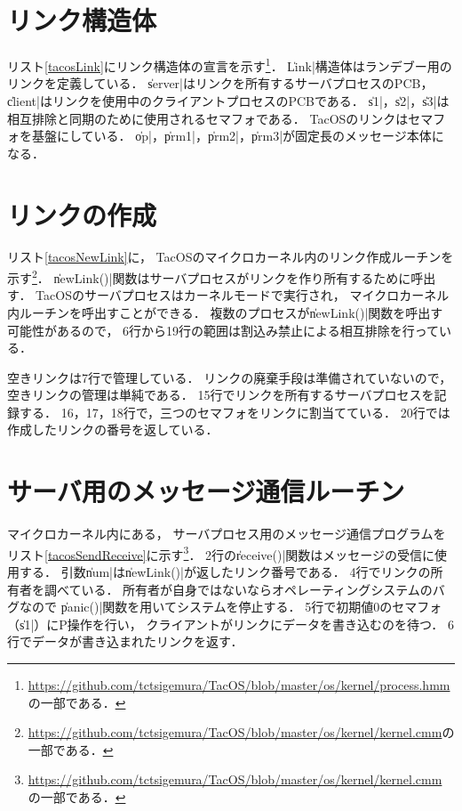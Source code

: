 \section{リンク構造体}
リスト\ref{tacosLink}にリンク構造体の宣言を示す\footnote{
  \url{https://github.com/tctsigemura/TacOS/blob/master/os/kernel/process.hmm}
  の一部である．}．
\|Link|構造体はランデブー用のリンクを定義している．
\|server|はリンクを所有するサーバプロセスのPCB，
\|client|はリンクを使用中のクライアントプロセスのPCBである．
\|s1|，\|s2|，\|s3|は
相互排除と同期のために使用されるセマフォである．
TacOSのリンクはセマフォを基盤にしている．
\|op|，\|prm1|，\|prm2|，\|prm3|が固定長のメッセージ本体になる．



\section{リンクの作成}
リスト\ref{tacosNewLink}に，
TacOSのマイクロカーネル内のリンク作成ルーチンを示す\footnote{
  \url{https://github.com/tctsigemura/TacOS/blob/master/os/kernel/kernel.cmm}の
  一部である．}．
\|newLink()|関数はサーバプロセスがリンクを作り所有するために呼出す．
TacOSのサーバプロセスはカーネルモードで実行され，
マイクロカーネル内ルーチンを呼出すことができる．
複数のプロセスが\|newLink()|関数を呼出す可能性があるので，
6行から19行の範囲は割込み禁止による相互排除を行っている．



空きリンクは7行で管理している．
リンクの廃棄手段は準備されていないので，
空きリンクの管理は単純である．
15行でリンクを所有するサーバプロセスを記録する．
16，17，18行で，三つのセマフォをリンクに割当てている．
20行では作成したリンクの番号を返している．

\section{サーバ用のメッセージ通信ルーチン}
マイクロカーネル内にある，
サーバプロセス用のメッセージ通信プログラムを
リスト\ref{tacosSendReceive}に示す\footnote{
  \url{https://github.com/tctsigemura/TacOS/blob/master/os/kernel/kernel.cmm}
  の一部である．}．
2行の\|receive()|関数はメッセージの受信に使用する．
引数\|num|は\|newLink()|が返したリンク番号である．
4行でリンクの所有者を調べている．
所有者が自身ではないならオペレーティングシステムのバグなので
\|panic()|関数を用いてシステムを停止する．
5行で初期値0のセマフォ（\|s1|）にP操作を行い，
クライアントがリンクにデータを書き込むのを待つ．
6行でデータが書き込まれたリンクを返す．

